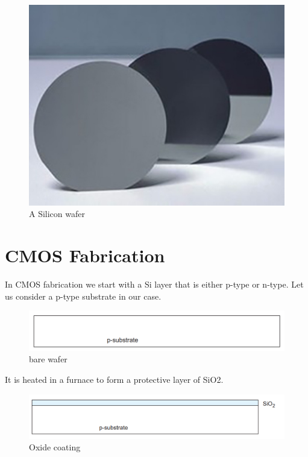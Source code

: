 \begin{figure}[htb]
\centering
\includegraphics[scale=0.3]{./fig3} %
\caption{A Silicon wafer}
\label{fig:label} %
\end{figure}

\pagebreak


\section{CMOS Fabrication}
In CMOS fabrication we start with a Si layer that is either p-type or n-type. Let us consider a p-type substrate in our case. 

\begin{figure}[htb]
\centering
\includegraphics[scale=0.3]{./fig4} %
\caption{bare wafer}
\label{3.4} %
\end{figure}

 
\noindent It is heated in a furnace to form a protective layer of SiO2. 

\begin{figure}[htb]
\centering
\includegraphics[scale=0.3]{./fig5} %
\caption{Oxide coating}
\label{3.5} %
\end{figure}
 
